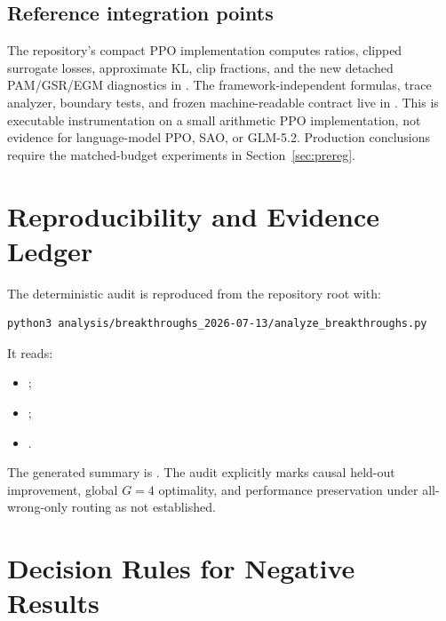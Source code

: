 \documentclass{article}
\begin{document}
\subsection{Reference integration points}

The repository's compact PPO implementation computes ratios, clipped surrogate
losses, approximate KL, clip fractions, and the new detached PAM/GSR/EGM
diagnostics in
. The
framework-independent formulas, trace analyzer, boundary tests, and frozen
machine-readable contract live in
. This is executable
instrumentation on a small arithmetic PPO implementation, not evidence for
language-model PPO, SAO, or GLM-5.2. Production conclusions require the
matched-budget experiments in Section~\ref{sec:prereg}.

\section{Reproducibility and Evidence Ledger}
\label{app:ledger}

The deterministic audit is reproduced from the repository root with:
\begin{verbatim}
python3 analysis/breakthroughs_2026-07-13/analyze_breakthroughs.py
\end{verbatim}
It reads:
\begin{itemize}[leftmargin=*]
  \item {};
  \item {};
  \item {}.
\end{itemize}
The generated summary is
.  The audit explicitly
marks causal held-out improvement, global $G=4$ optimality, and performance
preservation under all-wrong-only routing as not established.

\section{Decision Rules for Negative Results}
\end{document}
